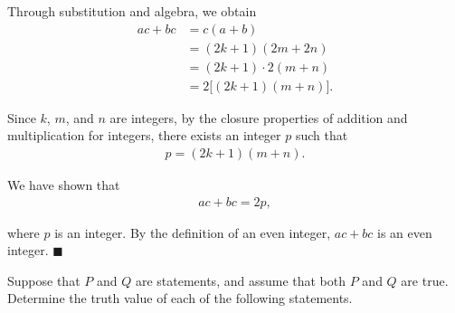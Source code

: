 \documentclass[10pt]{exam}
\begin{document}
\begin{questions}
\begin{solution}
Through substitution and algebra, we obtain
\begin{align*}
ac+bc &= c(a+b)\\
&= (2k+1)(2m+2n)\\
&= (2k+1) \cdot 2(m+n)\\
&= 2\bigl[(2k+1)(m+n)\bigr].
\end{align*}
 
Since $k$, $m$, and $n$ are integers, by the closure properties of addition and multiplication for integers, there exists an integer $p$ such that
\begin{align*}
p = (2k+1)(m+n).
\end{align*}
 
We have shown that
\begin{align*}
ac+bc = 2p,
\end{align*}
 
where $p$ is an integer. By the definition of an even integer, $ac+bc$ is an even integer. $\blacksquare$
\end{solution}

\question Suppose that $P$ and $Q$ are statements, and assume that both $P$ and $Q$ are true. Determine the truth value of each of the following statements.

\end{questions}
\end{document}
